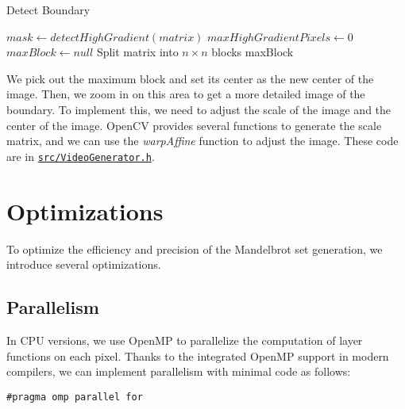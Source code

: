 \documentclass[11pt]{article}
\begin{document}
    \begin{algorithm}[H]
        \SetAlgoLined
        \caption{Detect Boundary}
        \label{alg:detect_boundary}
        $mask \leftarrow detectHighGradient(matrix)$\;
        $maxHighGradientPixels \leftarrow 0$\;
        $maxBlock \leftarrow null$\;
        Split matrix into $n \times n$ blocks\;
        \Return maxBlock\;
    \end{algorithm}

    We pick out the maximum block and set its center as the new center of the image.
    Then, we zoom in on this area to get a more detailed image of the boundary.
    To implement this, we need to adjust the scale of the image and the center of the image.
    OpenCV provides several functions to generate the scale matrix, and we can use the \textit{warpAffine}
    function to adjust the image.
    These code are in \href{https://github.com/AI1379/MandelbrotSet/blob/master/src/VideoGenerator.h}
    {\texttt{src/VideoGenerator.h}}.


    \section{Optimizations}\label{sec:optimizations}

    To optimize the efficiency and precision of the Mandelbrot set generation, we introduce several optimizations.

    \subsection{Parallelism}\label{subsec:parallelism}

    In CPU versions, we use OpenMP to parallelize the computation of layer functions on each pixel.
    Thanks to the integrated OpenMP support in modern compilers, we can implement parallelism with minimal code as
    follows:

    \begin{lstlisting}[gobble=8, label={lst:openmp_parallel_for}]
        #pragma omp parallel for
    \end{lstlisting}
\end{document}
